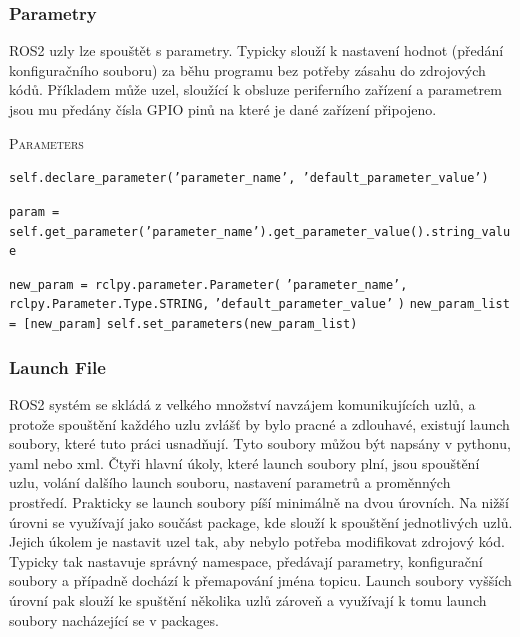 \subsubsection*{Parametry}
ROS2 uzly lze spouštět s parametry. Typicky slouží k nastavení hodnot (předání konfiguračního souboru) za běhu programu bez potřeby zásahu do zdrojových kódů. Příkladem může uzel, sloužící k obsluze periferního zařízení a parametrem jsou mu předány čísla GPIO pinů na které je dané zařízení připojeno. \cite{ros2_introduction}

\begin{algorithm}[h!]
	\label{}
	\caption{\textsc{Parameters}}
	
	\DontPrintSemicolon
	\SetAlgoNoLine
	\SetNlSty{}{}{:}
	\SetNlSkip{-1.1em}
	
	\BlankLine \Indp\Indpp
	
    \texttt{self.declare\_parameter('parameter\_name', 'default\_parameter\_value')}\;
	
	\BlankLine
	\texttt{param = self.get\_parameter('parameter\_name').get\_parameter\_value().string\_value}\;
	
	\BlankLine
	\texttt{new\_param = rclpy.parameter.Parameter(}\;
	\Indp\Indp
	\texttt{'parameter\_name',}\;
	\texttt{rclpy.Parameter.Type.STRING,}\;
	\texttt{'default\_parameter\_value'}\;
	\Indm\Indm
	\texttt{)}\;
	\texttt{new\_param\_list = [new\_param]}\;
	\texttt{self.set\_parameters(new\_param\_list)}\;

\end{algorithm}

\subsubsection*{Launch File}
ROS2 systém se skládá z velkého množství navzájem komunikujících uzlů, a protože spouštění každého uzlu zvlášť by bylo pracné a zdlouhavé, existují launch soubory, které tuto práci usnadňují. Tyto soubory můžou být napsány v pythonu, yaml nebo xml. Čtyři hlavní úkoly, které launch soubory plní, jsou spouštění uzlu, volání dalšího launch souboru, nastavení parametrů a proměnných prostředí. Prakticky se launch soubory píší minimálně na dvou úrovních. Na nižší úrovni se využívají jako součást package, kde slouží k spouštění jednotlivých uzlů. Jejich úkolem je nastavit uzel tak, aby nebylo potřeba modifikovat zdrojový kód. Typicky tak nastavuje správný namespace, předávají parametry, konfigurační soubory a případně dochází k přemapování jména topicu. Launch soubory vyšších úrovní pak slouží ke spuštění několika uzlů zároveň a využívají k tomu launch soubory nacházející se v packages. \cite{ros2_introduction}

